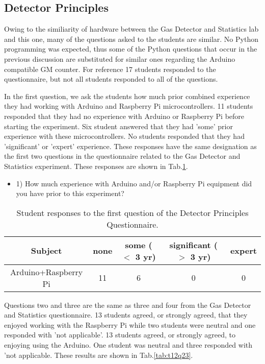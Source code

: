 \subsection{Detector Principles}
Owing to the similiarity of hardware between the Gas Detector and Statistics lab and this one, many of the questions asked to the students are similar.
No Python programming was expected, thus some of the Python questions that occur in the previous discussion are substituted for similar ones regarding the Arduino compatible GM counter.
For reference 17 students responded to the questionnaire, but not all students responded to all of the questions.

In the first question, we ask the students how much prior combined experience they had working with Arduino and Raspberry Pi microcontrollers.
11 students responded that they had no experience with Arduino or Raspberry Pi before starting the experiment.
Six student answered that they had 'some' prior experience with these microcontrollers.
No students responded that they had 'significant' or 'expert' experience.
These responses have the same designation as the first two questions in the questionnaire related to the Gas Detector and Statistics experiment.
These responses are shown in Tab.\ref{tab:t12q1}.

\begin{table}[htpb]
  \scriptsize
  \begin{center}
    \caption{\scriptsize Student responses to the first question of the Detector Principles Questionnaire.}
    \label{tab:t12q1}
    \begin{itemize}
    \item 1) How much experience with Arduino and/or Raspberry Pi equipment did you have prior to this experiment?
    \end{itemize}
    

    \begin{tabular}{|c | c | c | c | c |}
      \hline
      Subject & none & some ($<$ 3 yr) & significant  ($>$ 3 yr) & expert\\
      \hline
      Arduino+Raspberry Pi & 11 & 6 & 0 & 0\\
      \hline
    \end{tabular}
  \end{center}%
\end{table}

Questions two and three are the same as three and four from the Gas Detector and Statistics questionnaire.
13 students agreed, or strongly agreed, that they enjoyed working with the Raspberry Pi while two students were neutral and one responded with 'not applicable'.
13 students agreed, or strongly agreed, to enjoying using the Arduino.
One student was neutral and three responded with 'not applicable.
These results are shown in Tab.\ref{tab:t12q23}.


